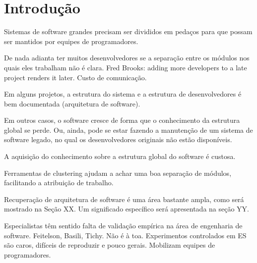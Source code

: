 %

\chapter{Introdução}



Sistemas de software grandes precisam ser divididos em pedaços para que possam ser mantidos por equipes de programadores.

De nada adianta ter muitos desenvolvedores se a separação entre os módulos nos quais eles trabalham não é clara. Fred Brooks: adding more developers to a late project renders it later. Custo de comunicação. %

Em alguns projetos, a estrutura do sistema e a estrutura de desenvolvedores é bem documentada (arquitetura de software).

Em outros casos, o software cresce de forma que o conhecimento da estrutura global se perde. Ou, ainda, pode se estar fazendo a manutenção de um sistema de software legado, no qual os desenvolvedores originais não estão disponíveis.

A aquisição do conhecimento sobre a estrutura global do software é custosa.

Ferramentas de clustering ajudam a achar uma boa separação de módulos, facilitando a atribuição de trabalho.

Recuperação de arquitetura de software é uma área bastante ampla, como será mostrado na Seção XX. Um significado específico será apresentada na seção YY.



Especialistas têm sentido falta de validação empírica na área de engenharia de software. Feitelson, Basili, Tichy. Não é à toa. Experimentos controlados em ES são caros, difíceis de reproduzir e pouco gerais. Mobilizam equipes de programadores. %

